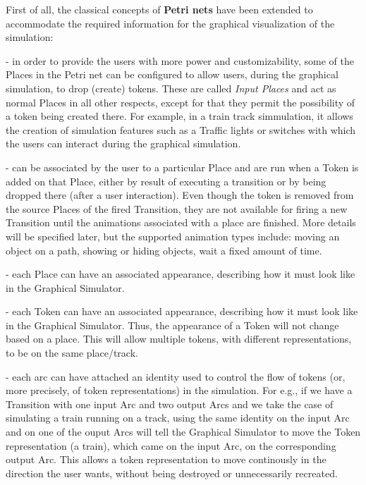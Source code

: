 First of all, the classical concepts of \textbf{Petri nets} have been extended to accommodate the
required information for the graphical visualization of the simulation:
\begin{description}
\item[Input Places] - in order to provide the users with more power and customizability, some of the
Places in the Petri net can be configured to allow users, during the graphical simulation, to drop
(create) tokens. These are called \textit{Input Places} and act as normal Places in all other
respects, except for that they permit the possibility of a token being created there. For example,
in a train track simmulation, it allows the creation of simulation features such as a Traffic lights
or switches with which the users can interact during the graphical simulation.
\item[Animations] - can be associated by the user to a particular Place and are run when a Token is
added on that Place, either by result of executing a transition or by being dropped there (after a
user interaction). Even though the token is removed from the source Places of the fired Transition,
they are not available for firing a new Transition until the animations associated with a place are
finished. More details will be specified later, but the supported animation types include: moving an
object on a path, showing or hiding objects, wait a fixed amount of time.
\item[Place Appearance] - each Place can have an associated appearance, describing how it must look
like in the Graphical Simulator.
\item[Token Appearance] - each Token can have an associated appearance, describing how it must look
like in the Graphical Simulator. Thus, the appearance of a Token will not change based on a place.
This will allow multiple tokens, with different representations, to be on the same place/track.
\item[Arc Identities] - each arc can have attached an identity used to control the flow of tokens
(or, more precisely, of token representations) in the simulation. For e.g., if we have a Transition
with one input Arc and two output Arcs and we take the case of simulating a train running on a
track, using the same identity on the input Arc and on one of the ouput Arcs will tell the Graphical
Simulator to move the Token representation (a train), which came on the input Arc, on the
corresponding output Arc. This allows a token representation to move continously in the direction
the user wants, without being destroyed or unnecessarily recreated.
\end{description}

